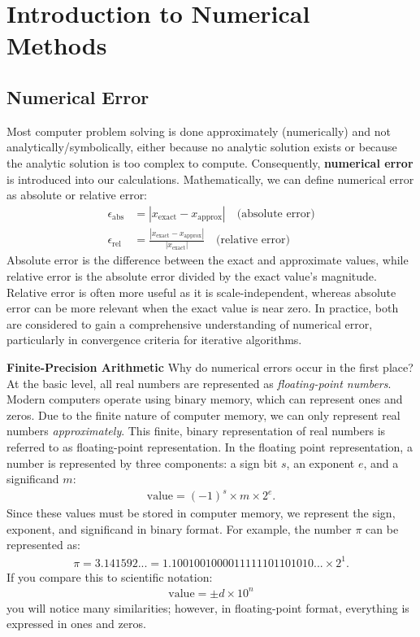 \chapter{Introduction to Numerical Methods}
\section{Numerical Error}
Most computer problem solving is done approximately (numerically) and not analytically/symbolically, either because no analytic solution exists or because the analytic solution is too complex to compute. Consequently, \textbf{numerical error} is introduced into our calculations. Mathematically, we can define numerical error as absolute or relative error:
\begin{align*}
    \epsilon_{\text{abs}} &= |x_{\text{exact}} - x_{\text{approx}}| \quad \text{(absolute error)} \\
    \epsilon_{\text{rel}} &= \frac{|x_{\text{exact}} - x_{\text{approx}}|}{|x_{\text{exact}}|} \quad \text{(relative error)}
\end{align*}
Absolute error is the difference between the exact and approximate values, while relative error is the absolute error divided by the exact value's magnitude.
Relative error is often more useful as it is scale-independent, whereas absolute error can be more relevant when the exact value is near zero.
In practice, both are considered to gain a comprehensive understanding of numerical error, particularly in convergence criteria for iterative algorithms.



\textbf{Finite-Precision Arithmetic}\quad
Why do numerical errors occur in the first place? At the basic level, all real numbers are represented as \emph{floating-point numbers}. Modern computers operate using binary memory, which can represent ones and zeros. Due to the finite nature of computer memory, we can only represent real numbers \emph{approximately}. This finite, binary representation of real numbers is referred to as floating-point representation. 
In the floating point representation, a number is represented by three components: a sign bit $s$, an exponent $e$, and a significand $m$:
\begin{align*}
\text{value} = (-1)^s \times m \times 2^e.
\end{align*}
Since these values must be stored in computer memory, we represent the sign, exponent, and significand in binary format. For example, the number $\pi$ can be represented as:
\begin{align*}
  \pi = 3.141592... = 1.1001001000011111101101010... \times 2^1.
\end{align*}
If you compare this to scientific notation:
\begin{align*}
  \text{value} = \pm d \times 10^n \tag{scientific notation}
\end{align*}
you will notice many similarities; however, in floating-point format, everything is expressed in ones and zeros.


